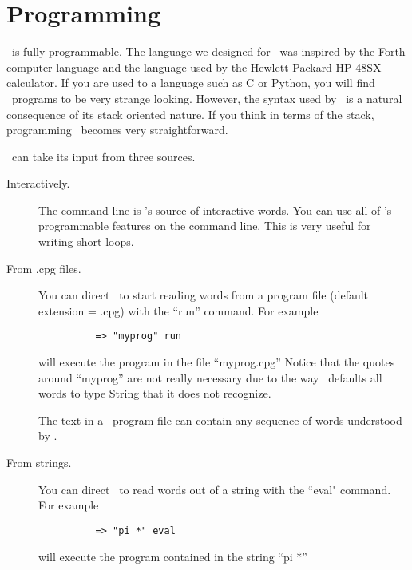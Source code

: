 
\chapter{Programming}


\CLAC\ is fully programmable. The language we designed for \CLAC\ was inspired by the Forth
computer language and the language used by the Hewlett-Packard HP-48SX calculator. If you are
used to a language such as C or Python, you will find \CLAC\ programs to be very strange
looking. However, the syntax used by \CLAC\ is a natural consequence of its stack oriented
nature. If you think in terms of the stack, programming \CLAC\ becomes very straightforward.

\CLAC\ can take its input from three sources.

\begin{description}
  
\item[Interactively.] The command line is \CLAC's source of interactive words. You can use all
  of \CLAC's programmable features on the command line. This is very useful for writing short
  loops.
  
\item[From .cpg files.] You can direct \CLAC\ to start reading words from a program file
  (default extension = .cpg) with the ``run'' command. For example

\begin{verbatim}
          => "myprog" run
\end{verbatim}
  
  will execute the program in the file ``myprog.cpg'' Notice that the quotes around ``myprog''
  are not really necessary due to the way \CLAC\ defaults all words to type String that it does
  not recognize.
  
  The text in a \CLAC\ program file can contain any sequence of words understood by \CLAC.
  
\item[From strings.] You can direct \CLAC\ to read words out of a string with the ``eval"
  command. For example

\begin{verbatim}
          => "pi *" eval
\end{verbatim}

     will execute the program contained in the string ``pi *''

\end{description}

